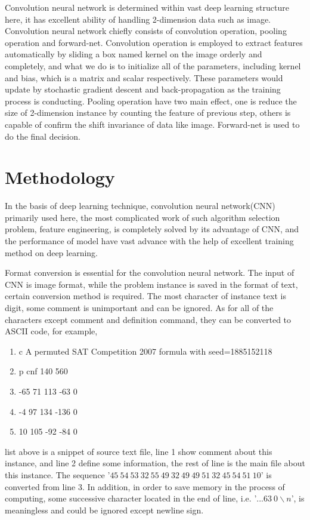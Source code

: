\documentclass{article}
\begin{document}
    Convolution neural network is determined within vast deep learning structure here, it has excellent ability of handling 2-dimension data such as image. Convolution neural network chiefly consists of convolution operation, pooling operation and forward-net. Convolution operation is employed to extract features automatically by sliding a box named kernel on the image orderly and completely, and what we do is to initialize all of the parameters, including kernel and bias, which is a matrix and scalar respectively. These parameters would update by stochastic gradient descent and back-propagation as the training process is conducting. Pooling operation have two main effect, one is reduce the size of 2-dimension instance by counting the feature of previous step, others is capable of confirm the shift invariance of data like image. Forward-net is used to do the final decision. 
    

\section{Methodology}
    In the basis of deep learning technique, convolution neural network(CNN) primarily used here, the most complicated work of such algorithm selection problem, feature engineering, is completely solved by its advantage of CNN, and the performance of model have vast advance with the help of excellent training method on deep learning.
    
    Format conversion is essential for the convolution neural network. The input of CNN is image format, while the problem instance is saved in the format of text, certain conversion method is required. The most character of instance text is digit, some comment is unimportant and can be ignored. As for all of the characters except comment and definition command, they can be converted to ASCII code, for example,
    \begin{enumerate}[itemsep=-1mm]
        \item c A permuted SAT Competition 2007 formula with seed=1885152118
        \item p cnf 140 560
        \item -65 71 113 -63 0
        \item -4 97 134 -136 0
        \item 10 105 -92 -84 0
    \end{enumerate}
    list above is a snippet of source text file, line 1 show comment about this instance, and line 2 define some information, the rest of line is the main file about this instance. The sequence '$45\ 54\ 53\ 32\ 55\ 49\ 32\ 49\ 49\ 51\ 32\ 45\ 54\ 51\ 10$' is converted from line 3.
    In addition, in order to save memory in the process of computing, some successive character located in the end of line, i.e. '$...63\  0\backslash{n}$', is meaningless and could be ignored except newline sign.
    
\end{document}
